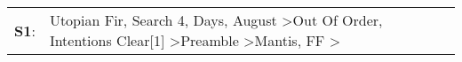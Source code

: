 \begin{supertabular}{p{0.03\textwidth}p{0.92\textwidth}}
 \textbf{S1}:  &  Utopian Fir\textsuperscript{}, \enspace Search 4\textsuperscript{},  Days\textsuperscript{}, \enspace August\textsuperscript{} \textgreater \enspace Out Of Order\textsuperscript{}, \enspace Intentions Clear[1]\textsuperscript{} \textgreater \enspace Preamble\textsuperscript{} \textgreater \enspace Mantis\textsuperscript{}, \enspace FF\textsuperscript{} \textgreater {}\textsuperscript{}  \enspace  \\
\end{supertabular}
